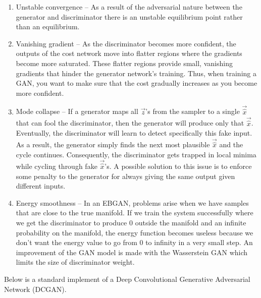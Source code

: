 \documentclass{article}
\begin{document}
\begin{enumerate}
    \item Unstable convergence -- As a result of the adversarial nature between the generator and discriminator there is an unstable equilibrium point rather than an equilibrium.

    \item Vanishing gradient -- As the discriminator becomes more confident, the outputs of the cost network move into flatter regions where the gradients become more saturated. These flatter regions provide small, vanishing gradients that hinder the generator network's training. Thus, when training a GAN, you want to make sure that the cost gradually increases as you become more confident.

    \item Mode collapse -- If a generator maps all $\vec{z}$'s from the sampler to a single $\vec{\hat{x}}$ that can fool the discriminator, then the generator will produce only that $\vec{\hat{x}}$. Eventually, the discriminator will learn to detect specifically this fake input. As a result, the generator simply finds the next most plausible $\vec{\hat{x}}$ and the cycle continues. Consequently, the discriminator gets trapped in local minima while cycling through fake $\vec{\hat{x}}$’s. A possible solution to this issue is to enforce some penalty to the generator for always giving the same output given different inputs.
    
    \item Energy smoothness -- In an EBGAN, problems arise when we have samples that are close to the true manifold. If we train the system successfully where we get the discriminator to produce $0$ outside the manifold and an infinite probability on the manifold, the energy function becomes useless because we don’t want the energy value to go from $0$ to infinity in a very small step. An improvement of the GAN model is made with the Wasserstein GAN which limits the size of discriminator weight.
\end{enumerate}

Below is a standard implement of a Deep Convolutional Generative Adversarial Network (DCGAN).
\end{document}
